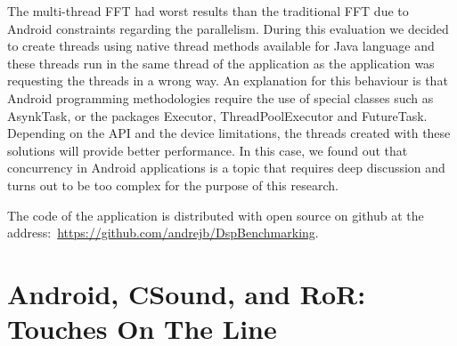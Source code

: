 The multi-thread FFT had worst results than the traditional FFT due to Android constraints regarding the parallelism.
During this evaluation we decided to create threads using native thread methods available for Java language and these threads run in the same thread of the application as the application was requesting the threads in a wrong way.
An explanation for this behaviour is that Android programming methodologies require the use of special classes such as AsynkTask, or the packages Executor, ThreadPoolExecutor and FutureTask.
Depending on the API and the device limitations, the threads created with these solutions will provide better performance.
In this case, we found out that concurrency in Android applications is a topic that requires deep discussion and turns out to be too complex for the purpose of this research.


The code of the application is distributed with open source on github at the address:~\url{https://github.com/andrejb/DspBenchmarking}.

\section{Android, CSound, and RoR: Touches On The Line}
\label{sec:apptouchesontheline}

